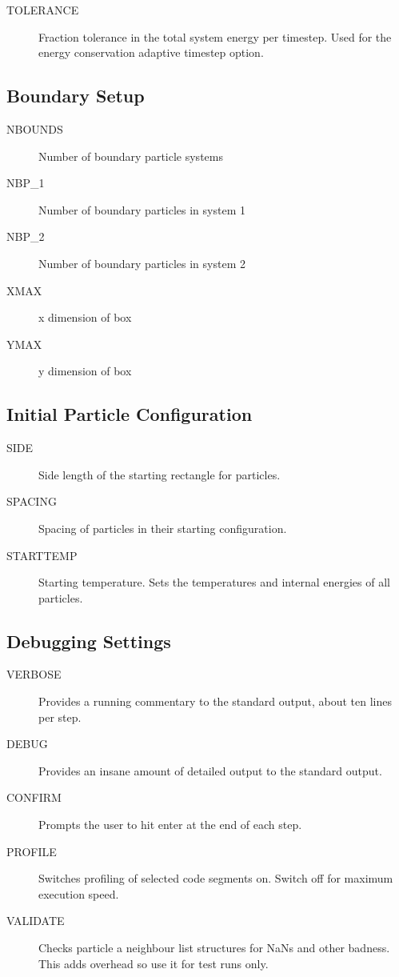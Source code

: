\begin{description}
\item[TOLERANCE] Fraction tolerance in the total system energy per
timestep. Used for the energy conservation adaptive timestep option.
\end{description}

\subsection{Boundary Setup}
\begin{description}
\item[NBOUNDS] Number of boundary particle systems
\item[NBP\_1] Number of boundary particles in system 1
\item[NBP\_2] Number of boundary particles in system 2
\item[XMAX] x dimension of box 
\item[YMAX] y dimension of box
 \end{description}
 
 \subsection{Initial Particle Configuration}
 \begin{description}
\item[SIDE] Side length of the starting rectangle for particles.
\item[SPACING] Spacing of particles in their starting configuration.
\item[STARTTEMP] Starting temperature. Sets the temperatures and internal
energies of all particles.
\end{description}

\subsection{Debugging Settings}
\begin{description}
\item[VERBOSE] Provides a running commentary to the standard output, about ten
    lines per step.
\item[DEBUG] Provides an insane amount of detailed output to the standard
    output.
\item[CONFIRM] Prompts the user to hit enter at the end of each step.
\item[PROFILE] Switches profiling of selected code segments on. Switch off for
    maximum execution speed.
\item[VALIDATE] Checks particle a neighbour list structures for NaNs and other
    badness. This adds overhead so use it for test runs only.
\end{description}

